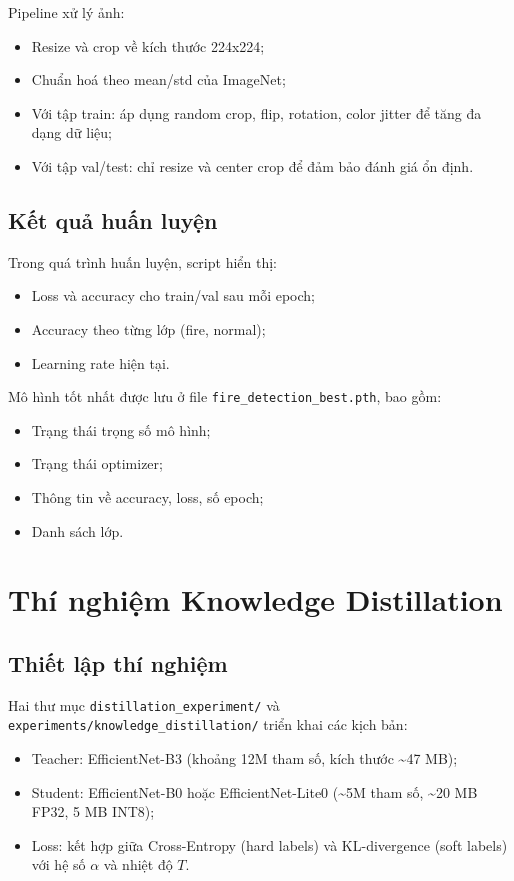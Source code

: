 \documentclass[12pt,a4paper]{report}
\begin{document}
Pipeline xử lý ảnh:
\begin{itemize}
  \item Resize và crop về kích thước 224x224;
  \item Chuẩn hoá theo mean/std của ImageNet;
  \item Với tập train: áp dụng random crop, flip, rotation, color jitter để tăng đa dạng dữ liệu;
  \item Với tập val/test: chỉ resize và center crop để đảm bảo đánh giá ổn định.
\end{itemize}

\subsection{Kết quả huấn luyện}

Trong quá trình huấn luyện, script hiển thị:
\begin{itemize}
  \item Loss và accuracy cho train/val sau mỗi epoch;
  \item Accuracy theo từng lớp (fire, normal);
  \item Learning rate hiện tại.
\end{itemize}

Mô hình tốt nhất được lưu ở file \texttt{fire\_detection\_best.pth}, bao gồm:
\begin{itemize}
  \item Trạng thái trọng số mô hình;
  \item Trạng thái optimizer;
  \item Thông tin về accuracy, loss, số epoch;
  \item Danh sách lớp.
\end{itemize}

\section{Thí nghiệm Knowledge Distillation}

\subsection{Thiết lập thí nghiệm}

Hai thư mục \texttt{distillation\_experiment/} và \texttt{experiments/knowledge\_distillation/} triển khai các kịch bản:
\begin{itemize}
  \item Teacher: EfficientNet-B3 (khoảng 12M tham số, kích thước \textasciitilde 47 MB);
  \item Student: EfficientNet-B0 hoặc EfficientNet-Lite0 (\textasciitilde 5M tham số, \textasciitilde 20 MB FP32, 5 MB INT8);
  \item Loss: kết hợp giữa Cross-Entropy (hard labels) và KL-divergence (soft labels) với hệ số \(\alpha\) và nhiệt độ \(T\).
\end{itemize}
\end{document}
